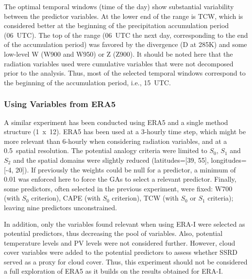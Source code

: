 \documentclass[draft]{agujournal2019}
\begin{document}
The optimal temporal windows (time of the day) show substantial variability between the predictor variables. At the lower end of the range is TCW, which is considered better at the beginning of the precipitation accumulation period (06~UTC). The top of the range (06~UTC the next day, corresponding to the end of the accumulation period) was favored by the divergence (D at 285\degree K) and some low-level W (W900 and W950) or Z (Z900). It should be noted here that the radiation variables used were cumulative variables that were not decomposed prior to the analysis. Thus, most of the selected temporal windows correspond to the beginning of the accumulation period, i.e., 15~UTC.


\subsubsection{Using Variables from ERA5}

A similar experiment has been conducted using ERA5 and a single method structure (1~x~12). ERA5 has been used at a 3-hourly time step, which might be more relevant than 6-hourly when considering radiation variables, and at a 0.5\degree\ spatial resolution. The potential analogy criteria were limited to $S_{0}$, $S_{1}$ and $S_{2}$ and the spatial domains were slightly reduced (latitudes=[39, 55], longitudes=[-4, 20]). If previously the weights could be null for a predictor, a minimum of 0.01 was enforced here to force the GAs to select a relevant predictor. Finally, some predictors, often selected in the previous experiment, were fixed: W700 (with $S_{0}$ criterion), CAPE (with $S_{0}$ criterion), TCW (with $S_{0}$ or $S_{1}$ criteria); leaving nine predictors unconstrained.

In addition, only the variables found relevant when using ERA-I were selected as potential predictors, thus decreasing the pool of variables. Also, potential temperature levels and PV levels were not considered further. However, cloud cover variables were added to the potential predictors to assess whether SSRD served as a proxy for cloud cover. Thus, this experiment should not be considered a full exploration of ERA5 as it builds on the results obtained for ERA-I.
\end{document}

